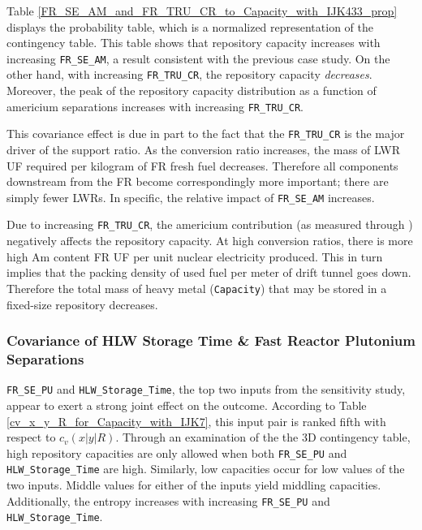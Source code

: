 Table \ref{FR_SE_AM_and_FR_TRU_CR_to_Capacity_with_IJK433_prop} displays the 
probability table, which is a normalized representation of the contingency table.
This table shows that repository capacity increases with increasing \texttt{FR\_SE\_AM}, 
a result consistent
with the previous case study.  On the other hand, with increasing \texttt{FR\_TRU\_CR}, 
the repository capacity \emph{decreases}.  Moreover, the
peak of the repository capacity distribution as a function
of americium separations increases with increasing \texttt{FR\_TRU\_CR}.

This covariance effect is due in part to the fact that the \texttt{FR\_TRU\_CR} is the 
major driver of the support ratio.  As the conversion ratio
increases, the mass of LWR UF required per kilogram of FR fresh fuel decreases.  
Therefore all components downstream from the FR become correspondingly more important;
there are simply fewer LWRs.  In specific, the relative impact of \texttt{FR\_SE\_AM} increases.

Due to increasing \texttt{FR\_TRU\_CR}, the americium contribution (as measured 
through ) negatively affects the repository capacity.  At high 
conversion ratios, there is more high Am content FR UF per unit nuclear 
electricity produced.  This in turn implies that the
packing density of used fuel per meter of drift tunnel goes down.  Therefore 
the total mass of heavy metal (\texttt{Capacity}) that may be stored in a
fixed-size repository decreases.


\subsubsection{Covariance of HLW Storage Time \& Fast Reactor Plutonium Separations}
\label{cts_sec:hlw_pu_covariance}

\texttt{FR\_SE\_PU} and \texttt{HLW\_Storage\_Time}, the top two inputs 
from the sensitivity study, appear to exert a strong joint effect on the 
outcome.  According to Table \ref{cv_x_y_R_for_Capacity_with_IJK7}, this 
input pair is ranked fifth with respect to $c_v(x|y|R)$.
Through an examination of the the 3D contingency table, high repository 
capacities are only allowed when both \texttt{FR\_SE\_PU} and
\texttt{HLW\_Storage\_Time} are high.  Similarly, low capacities occur 
for low values of the two inputs.  Middle values for either of the
inputs yield middling capacities.  Additionally, the entropy increases 
with increasing \texttt{FR\_SE\_PU} and \texttt{HLW\_Storage\_Time}.

